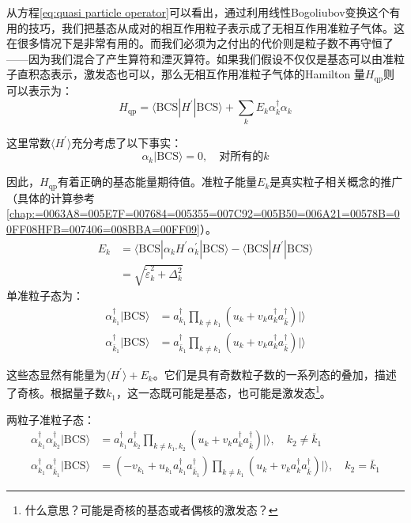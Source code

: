 从方程\ref{eq:quasi particle operator}可以看出，通过利用线性Bogoliubov变换这个有用的技巧，我们把基态从成对的相互作用粒子表示成了无相互作用准粒子气体。这在很多情况下是非常有用的。而我们必须为之付出的代价则是粒子数不再守恒了——因为我们混合了产生算符和湮灭算符。如果我们假设不仅仅是基态可以由准粒子直积态表示，激发态也可以，那么无相互作用准粒子气体的Hamilton
量$H_{\text{qp}}$则可以表示为：
\[
H_{\text{qp}}=\langle\text{BCS}|H^{\prime}|\text{BCS}\rangle+\sum_{k}E_{k}\alpha^{\dagger}_{k}\alpha_{k}
\]

这里常数$\langle H^{\prime}\rangle$充分考虑了以下事实：
\[
\alpha_{k}|\text{BCS}\rangle=0,\quad\text{对所有的}k
\]

因此，$H_{\text{qp}}$有着正确的基态能量期待值。准粒子能量$E_{k}$是真实粒子相关概念的推广（具体的计算参考\ref{chap:=0063A8=005E7F=007684=005355=007C92=005B50=006A21=00578B=00FF08HFB=007406=008BBA=00FF09}）。
\begin{align*}
E_{k} & =\langle\text{BCS}|\alpha_{k}H^{\prime}\alpha^{\prime}_{k}|\text{BCS}\rangle-\langle\text{BCS}|H^{\prime}|\text{BCS}\rangle\\
 & =\sqrt{\tilde{\varepsilon}^{2}_{k}+\Delta^{2}_{k}}
\end{align*}
 单准粒子态为：
\begin{align*}
\alpha^{\dagger}_{k_{1}}|\text{BCS}\rangle & =a^{\dagger}_{k_{1}}\prod_{k\neq k_{1}}(u_{k}+v_{k}a^{\dagger}_{k}a^{\dagger}_{\bar{k}})|\rangle\\
\alpha^{\dagger}_{\bar{k}_{1}}|\text{BCS}\rangle & =a^{\dagger}_{\bar{k}_{1}}\prod_{k\neq k_{1}}(u_{k}+v_{k}a^{\dagger}_{k}a^{\dagger}_{\bar{k}})|\rangle
\end{align*}

这些态显然有能量为$\langle H^{\prime}\rangle+E_{k}$。它们是具有奇数粒子数的一系列态的叠加，描述了奇核。根据量子数$k_{1}$，这一态既可能是基态，也可能是激发态\footnote{什么意思？可能是奇核的基态或者偶核的激发态？}。

两粒子准粒子态：
\begin{align*}
\alpha^{\dagger}_{k_{1}}\alpha^{\dagger}_{k_{2}}|\text{BCS}\rangle & =a^{\dagger}_{k_{1}}a^{\dagger}_{k_{2}}\prod_{k\neq k_{1},k_{2}}(u_{k}+v_{k}a^{\dagger}_{k}a^{\dagger}_{\bar{k}})|\rangle,\quad k_{2}\neq\bar{k}_{1}\\
\alpha^{\dagger}_{k_{1}}\alpha^{\dagger}_{\bar{k}_{1}}|\text{BCS}\rangle & =(-v_{k_{1}}+u_{k_{1}}a^{\dagger}_{k_{1}}a^{\dagger}_{\bar{k}_{1}})\prod_{k\neq k_{1}}(u_{k}+v_{k}a^{\dagger}_{k}a^{\dagger}_{\bar{k}})|\rangle,\quad k_{2}=\bar{k}_{1}
\end{align*}

